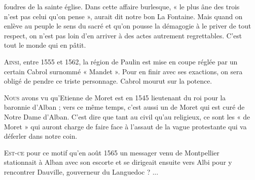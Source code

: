 
foudres de la sainte église. Dans cette affaire burlesque,
« le plus âne des trois n'est pas celui qu'on pense »,
aurait dit notre bon La Fontaine. Mais quand on enlève au
peuple le sens du sacré et qu'on pousse la démagogie à le
priver de tout respect, on n'est pas loin d'en arriver à
des actes autrement regrettables. C'est tout le monde qui
en pâtit.

\lettrine{A}{insi}, entre 1555 et 1562, la région de Paulin
est mise en coupe réglée par un certain Cabrol surnommé
« Mandet ». Pour en finir avec ses exactions, on sera obligé
de pendre ce triste personnage. Cabrol mourut sur la potence.

\lettrine{N}{ous} avons vu qu'Etienne de Moret est en 1545
lieutenant du roi pour la baronnie d'Alban ; vers ce même
temps, c'est aussi un de Moret qui est curé de Notre Dame
d'Alban. C'est dire que tant au civil qu'au religieux,
ce sont les « de Moret » qui auront charge de faire face
à l'assaut de la vague protestante qui va déferler dans
notre coin.

\lettrine{E}{st-ce} pour ce motif qu'en août 1565 un messager
venu de Montpellier stationnait à Alban avec son escorte et
se dirigeait ensuite vers Albi pour y rencontrer Dauville,
gouverneur du Languedoc ? ...
